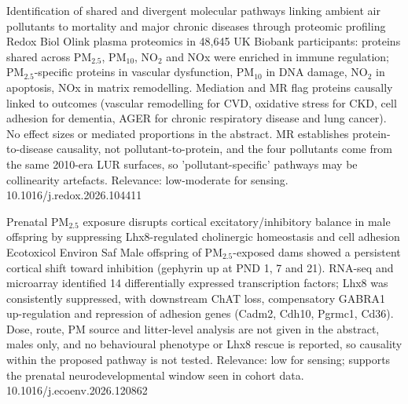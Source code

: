 \documentclass[10pt]{article}
\begin{document}
\par{}\baselineskip{}\baselineskip
{}

{Identification of shared and divergent molecular pathways linking ambient air pollutants to mortality and major chronic diseases through proteomic profiling}
{Redox Biol}
{Olink plasma proteomics in 48,645 UK Biobank participants: proteins shared across PM$_{2.5}$, PM$_{10}$, NO$_2$ and NOx were enriched in immune regulation; PM$_{2.5}$-specific proteins in vascular dysfunction, PM$_{10}$ in DNA damage, NO$_2$ in apoptosis, NOx in matrix remodelling. Mediation and MR flag proteins causally linked to outcomes (vascular remodelling for CVD, oxidative stress for CKD, cell adhesion for dementia, AGER for chronic respiratory disease and lung cancer). No effect sizes or mediated proportions in the abstract. MR establishes protein-to-disease causality, not pollutant-to-protein, and the four pollutants come from the same 2010-era LUR surfaces, so 'pollutant-specific' pathways may be collinearity artefacts. Relevance: low-moderate for sensing.}
{10.1016/j.redox.2026.104411}

{Prenatal PM$_{2.5}$ exposure disrupts cortical excitatory/inhibitory balance in male offspring by suppressing Lhx8-regulated cholinergic homeostasis and cell adhesion}
{Ecotoxicol Environ Saf}
{Male offspring of PM$_{2.5}$-exposed dams showed a persistent cortical shift toward inhibition (gephyrin up at PND 1, 7 and 21). RNA-seq and microarray identified 14 differentially expressed transcription factors; Lhx8 was consistently suppressed, with downstream ChAT loss, compensatory GABRA1 up-regulation and repression of adhesion genes (Cadm2, Cdh10, Pgrmc1, Cd36). Dose, route, PM source and litter-level analysis are not given in the abstract, males only, and no behavioural phenotype or Lhx8 rescue is reported, so causality within the proposed pathway is not tested. Relevance: low for sensing; supports the prenatal neurodevelopmental window seen in cohort data.}
{10.1016/j.ecoenv.2026.120862}

\par{}\baselineskip{}\baselineskip
{}
\end{document}
